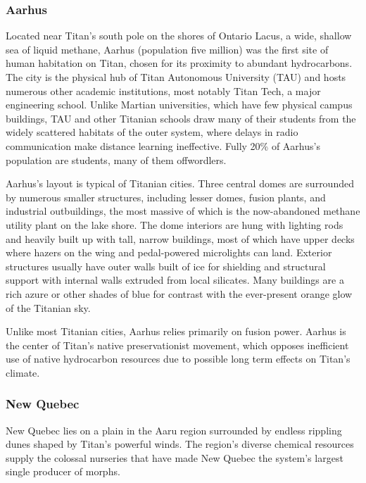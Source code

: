 \subsubsection{Aarhus} \label{sec:aarhus} 

Located near Titan's south pole on the shores of Ontario Lacus, a wide, shallow sea of liquid methane, Aarhus (population five million) was the first site of human habitation on Titan, chosen for its proximity to abundant hydrocarbons. The city is the physical hub of Titan Autonomous University (TAU) and hosts numerous other academic institutions, most notably Titan Tech, a major engineering school. Unlike Martian universities, which have few physical campus buildings, TAU and other Titanian schools draw many of their students from the widely scattered habitats of the outer system, where delays in radio communication make distance learning ineffective. Fully 20\% of Aarhus's population are students, many of them offwordlers. 

Aarhus's layout is typical of Titanian cities. Three central domes are surrounded by numerous smaller structures, including lesser domes, fusion plants, and industrial outbuildings, the most massive of which is the now-abandoned methane utility plant on the lake shore. The dome interiors are hung with lighting rods and heavily built up with tall, narrow buildings, most of which have upper decks where hazers on the wing and pedal-powered microlights can land. Exterior structures usually have outer walls built of ice for shielding and structural support with internal walls extruded from local silicates. Many buildings are a rich azure or other shades of blue for contrast with the ever-present orange glow of the Titanian sky. 

Unlike most Titanian cities, Aarhus relies primarily on fusion power. Aarhus is the center of Titan's native preservationist movement, which opposes inefficient use of native hydrocarbon resources due to possible long term effects on Titan's climate. 

\subsubsection{New Quebec} \label{sec:new-quebec} 

New Quebec lies on a plain in the Aaru region surrounded by endless rippling dunes shaped by Titan's powerful winds. The region's diverse chemical resources supply the colossal nurseries that have made New Quebec the system's largest single producer of morphs. 

